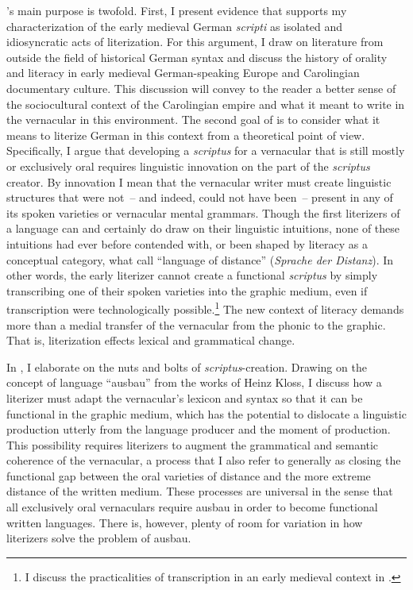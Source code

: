 ’s main purpose is twofold. First, I present evidence that supports my characterization of the early medieval German \textit{scripti} as isolated and idiosyncratic acts of literization. For this argument, I draw on literature from outside the field of historical German syntax and discuss the history of orality and literacy in early medieval German-speaking Europe and Carolingian documentary culture. This discussion will convey to the reader a better sense of the sociocultural context of the Carolingian empire and what it meant to write in the vernacular in this environment. The second goal of  is to consider what it means to literize German in this context from a theoretical point of view. Specifically, I argue that developing a \textit{scriptus} for a vernacular that is still mostly or exclusively oral requires linguistic innovation on the part of the \textit{scriptus} creator. By innovation I mean that the vernacular writer must create linguistic structures that were not~-- and indeed, could not have been~-- present in any of its spoken varieties or vernacular mental grammars. Though the first literizers of a language can and certainly do draw on their linguistic intuitions, none of these intuitions had ever before contended with, or been shaped by literacy as a conceptual category, what \citet{KochOesterreicher1985} call “language of distance” (\textit{Sprache der Distanz}). In other words, the early literizer cannot create a functional \textit{scriptus} by simply transcribing one of their spoken varieties into the graphic medium, even if transcription were technologically possible.\footnote{I discuss the practicalities of transcription in an early medieval context in .} The new context of literacy demands more than a medial transfer of the vernacular from the phonic to the graphic. That is, literization effects lexical and grammatical change.

In , I elaborate on the nuts and bolts of \textit{scriptus}{}-creation. Drawing on the concept of language “ausbau” from the works of Heinz Kloss, I discuss how a literizer must adapt the vernacular’s lexicon and syntax so that it can be functional in the graphic medium, which has the potential to dislocate a linguistic production utterly from the language producer and the moment of production. This possibility requires literizers to augment the grammatical and semantic coherence of the vernacular, a process that I also refer to generally as closing the functional gap between the oral varieties of distance and the more extreme distance of the written medium. These processes are universal in the sense that all exclusively oral vernaculars require ausbau in order to become functional written languages. There is, however, plenty of room for variation in how literizers solve the problem of ausbau.

